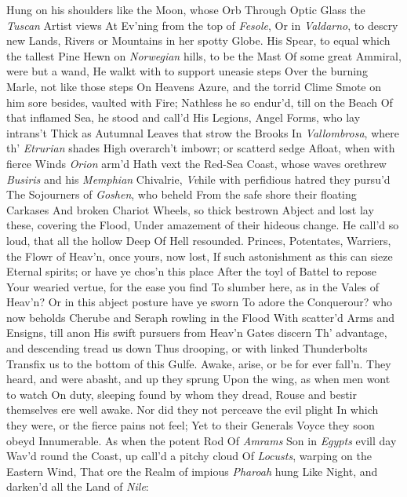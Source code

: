\documentclass[11pt]{book}
\begin{document}
Hung on his shoulders like the Moon, whose Orb 
Through Optic Glass the \textit{Tuscan} Artist views 
At Ev'ning from the top of \textit{Fesole}, 
Or in \textit{Valdarno}, to descry new Lands, 
Rivers or Mountains in her spotty Globe. 
His Spear, to equal which the tallest Pine 
Hewn on \textit{Norwegian} hills, to be the Mast 
Of some great Ammiral, were but a wand, 
He walkt with to support uneasie steps 
Over the burning Marle, not like those steps 
On Heavens Azure, and the torrid Clime 
Smote on him sore besides, vaulted with Fire; 
Nathless he so endur'd, till on the Beach 
Of that inflamed Sea, he stood and call'd 
His Legions, Angel Forms, who lay intrans't 
Thick as Autumnal Leaves that strow the Brooks 
In \textit{Vallombrosa}, where th' \textit{Etrurian} shades 
High overarch't imbowr; or scatterd sedge 
Afloat, when with fierce Winds \textit{Orion} arm'd 
Hath vext the Red-Sea Coast, whose waves orethrew 
\textit{Busiris} and his \textit{Memphian} Chivalrie, 
\textit{Vv}hile with perfidious hatred they pursu'd 
The Sojourners of \textit{Goshen}, who beheld 
From the safe shore their floating Carkases 
And broken Chariot Wheels, so thick bestrown 
Abject and lost lay these, covering the Flood, 
Under amazement of their hideous change. 
He call'd so loud, that all the hollow Deep 
Of Hell resounded.  Princes, Potentates, 
Warriers, the Flowr of Heav'n, once yours, now lost, 
If such astonishment as this can sieze 
Eternal spirits; or have ye chos'n this place 
After the toyl of Battel to repose 
Your wearied vertue, for the ease you find 
To slumber here, as in the Vales of Heav'n? 
Or in this abject posture have ye sworn 
To adore the Conquerour? who now beholds 
Cherube and Seraph rowling in the Flood 
With scatter'd Arms and Ensigns, till anon 
His swift pursuers from Heav'n Gates discern 
Th' advantage, and descending tread us down 
Thus drooping, or with linked Thunderbolts 
Transfix us to the bottom of this Gulfe. 
Awake, arise, or be for ever fall'n. 
\quad They heard, and were abasht, and up they sprung 
Upon the wing, as when men wont to watch 
On duty, sleeping found by whom they dread, 
Rouse and bestir themselves ere well awake. 
Nor did they not perceave the evil plight 
In which they were, or the fierce pains not feel; 
Yet to their Generals Voyce they soon obeyd 
Innumerable.  As when the potent Rod 
Of \textit{Amrams} Son in \textit{Egypts} evill day 
Wav'd round the Coast, up call'd a pitchy cloud 
Of \textit{Locusts}, warping on the Eastern Wind, 
That ore the Realm of impious \textit{Pharoah} hung 
Like Night, and darken'd all the Land of \textit{Nile}: 
\end{document}
